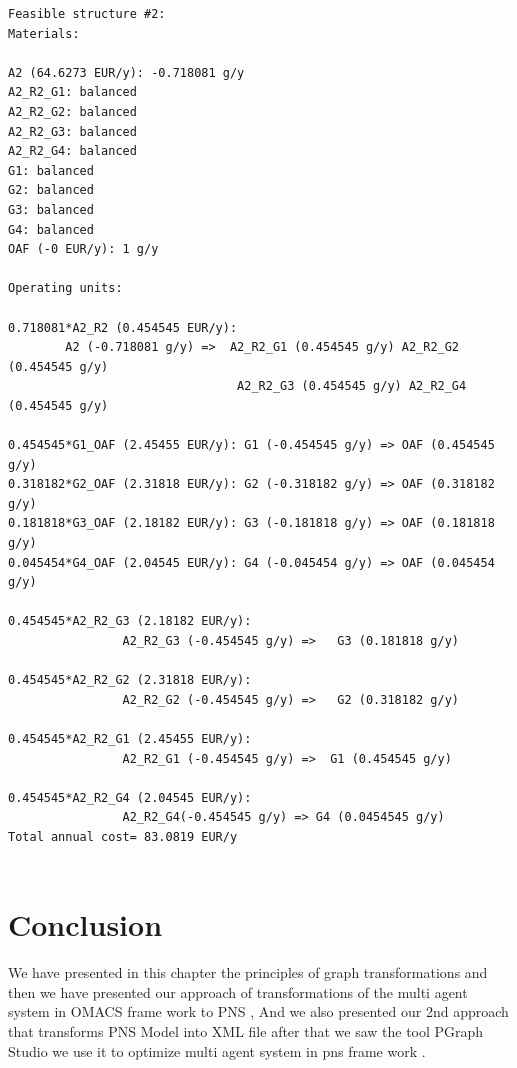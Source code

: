 \begin{lstlisting}[caption=Part from Graph.out]
Feasible structure #2:
Materials:

A2 (64.6273 EUR/y): -0.718081 g/y
A2_R2_G1: balanced
A2_R2_G2: balanced
A2_R2_G3: balanced
A2_R2_G4: balanced
G1: balanced
G2: balanced
G3: balanced
G4: balanced
OAF (-0 EUR/y): 1 g/y

Operating units:

0.718081*A2_R2 (0.454545 EUR/y): 
		A2 (-0.718081 g/y) =>  A2_R2_G1 (0.454545 g/y) A2_R2_G2 (0.454545 g/y) 
								A2_R2_G3 (0.454545 g/y) A2_R2_G4 (0.454545 g/y) 
								
0.454545*G1_OAF (2.45455 EUR/y): G1 (-0.454545 g/y) => OAF (0.454545 g/y) 
0.318182*G2_OAF (2.31818 EUR/y): G2 (-0.318182 g/y) => OAF (0.318182 g/y) 
0.181818*G3_OAF (2.18182 EUR/y): G3 (-0.181818 g/y) => OAF (0.181818 g/y) 
0.045454*G4_OAF (2.04545 EUR/y): G4 (-0.045454 g/y) => OAF (0.045454 g/y) 

0.454545*A2_R2_G3 (2.18182 EUR/y): 
				A2_R2_G3 (-0.454545 g/y) =>   G3 (0.181818 g/y) 
				
0.454545*A2_R2_G2 (2.31818 EUR/y):
				A2_R2_G2 (-0.454545 g/y) =>   G2 (0.318182 g/y) 
				
0.454545*A2_R2_G1 (2.45455 EUR/y): 
				A2_R2_G1 (-0.454545 g/y) =>  G1 (0.454545 g/y) 
				
0.454545*A2_R2_G4 (2.04545 EUR/y): 
				A2_R2_G4(-0.454545 g/y) => G4 (0.0454545 g/y) 
Total annual cost= 83.0819 EUR/y


\end{lstlisting}

\section{Conclusion}
We have presented in this chapter the principles of graph transformations and then we have presented our approach of transformations of the multi agent system in OMACS frame work to PNS , And we also presented our 2nd
approach that transforms PNS Model  into XML file after that we saw the tool
PGraph Studio we use it to optimize multi agent system in pns frame work .

